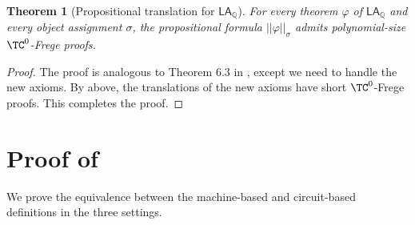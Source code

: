 \documentclass[11pt]{article}
\newcommand{\LAQ}{\mathsf{LA}_\mathbb{Q}}
\theoremstyle{definition}
\theoremstyle{plain}
\newtheorem{theorem}[definition]{Theorem}
\theoremstyle{remark}
\begin{document}
\begin{theorem}[Propositional translation for $\LAQ$]
\label{thm:new-propositional-translation}
    For every theorem $\varphi$ of $\LAQ$ and every object assignment $\sigma$, the propositional formula $||\varphi||_\sigma$ admits polynomial-size $\TC^0$-Frege proofs.
\end{theorem}

\begin{proof}
    The proof is analogous to Theorem 6.3 in \cite{cooksoltys}, except we need to handle the new axioms. By  above, the translations of the new axioms have short $\TC^0$-Frege proofs. This completes the proof.
\end{proof}


\section{Proof of }
\label{app:equivalence}
We prove the equivalence between the machine-based and circuit-based definitions in the three settings.
\end{document}
